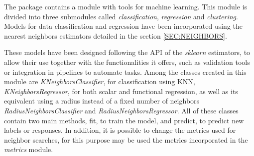 

The package contains a module with tools for machine learning.
This module is divided into three submodules called \textit{classification},
\textit{regression} and \textit{clustering}.
Models for data classification and regression have been incorporated using
the nearest neighbors estimators detailed in the section \ref{SEC:NEIGHBORS}.

These models have been designed following the \acs{API} of the \textit{sklearn} estimators,
to allow their use together with the functionalities it offers, such as
validation tools or integration in pipelines to automate tasks.
Among the classes created in this module are \textit{KNeighborsClassifier},
for classification using \acs{KNN}, \textit{KNeighborsRegressor},
for both scalar and functional regression,
as well as its equivalent using a radius instead of a fixed number of neighbors
\textit{RadiusNeighborsClassifier} and \textit{RadiusNeighborsRegressor}.
All of these classes contain two main methods, fit, to train the model,
and predict, to predict new labels or responses.
In addition, it is possible to change the metrics used for neighbor searches,
for this purpose  may be used the metrics incorporated in the \textit{metrics}
module.
